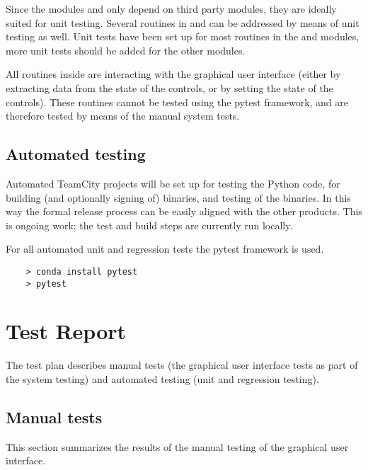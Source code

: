 Since the modules  and  only depend on third party modules, they are ideally suited for unit testing.
Several routines in  and  can be addressed by means of unit testing as well.
Unit tests have been set up for most routines in the  and  modules, more unit tests should be added for the other modules.

All routines inside  are interacting with the graphical user interface (either by extracting data from the state of the controls, or by setting the state of the controls).
These routines cannot be tested using the pytest framework, and are therefore tested by means of the manual system tests.

\section{Automated testing}

Automated TeamCity projects will be set up for testing the Python code, for building (and optionally signing of) binaries, and testing of the binaries.
In this way the formal release process can be easily aligned with the other products.
This is ongoing work; the test and build steps are currently run locally.

For all automated unit and regression tests the pytest framework is used.

\begin{Verbatim}
    > conda install pytest
    > pytest
\end{Verbatim}

\chapter{Test Report} \label{Chp:TestReport}

The test plan describes manual tests (the graphical user interface tests as part of the system testing) and automated testing (unit and regression testing).

\section{Manual tests}

This section summarizes the results of the manual testing of the graphical user interface.

